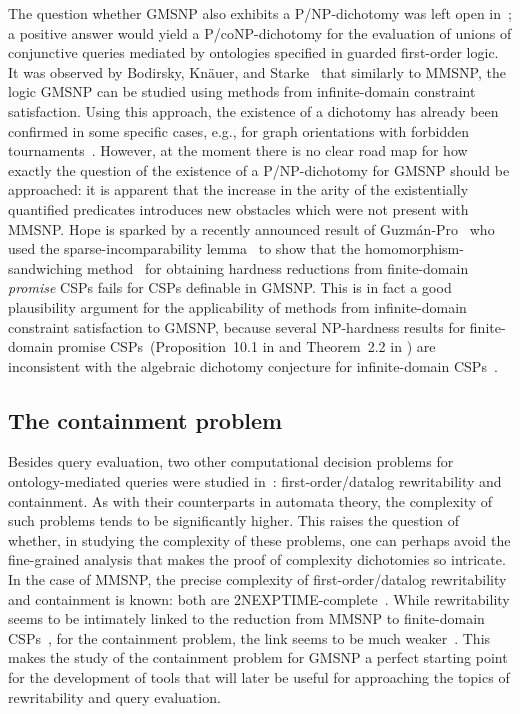 \documentclass[oneside,reqno,12pt]{amsart}
\theoremstyle{plain}
\theoremstyle{remark}
\newcommand{\TWONEXPTIME}{{\textup{\textsf{2NEXPTIME}}}\xspace}
\begin{document}
The question whether GMSNP also exhibits a \textsf{P}/\textsf{NP}-dichotomy was left open in~\cite{bienvenu2014};
a positive answer would yield a \textsf{P}/\textsf{coNP}-dichotomy for the evaluation of unions of conjunctive queries mediated by ontologies specified in guarded first-order logic. 
It was observed by Bodirsky, Kn\"{a}uer, and Starke~\cite{bodirsky_asnp} that similarly to MMSNP, the logic GMSNP can be studied using methods from infinite-domain constraint satisfaction.
Using this approach, the existence of a dichotomy has already been  confirmed in some specific cases, e.g., for graph orientations with forbidden tournaments~\cite{bodirsky2023forbidden,bitter2024completion, feller2024algebraic}. 
However, at the moment there is no clear road map for how exactly the question of the existence of a \textsf{P}/\textsf{NP}-dichotomy for GMSNP should be approached: it is apparent that the increase in the arity of the existentially quantified predicates introduces new obstacles which were not present with MMSNP. 
Hope is sparked by a recently announced result of Guzm\'{a}n-Pro~\cite{guzman2024gmsnp} who used the sparse-incomparability lemma~\cite{kun2013}  to show that the homomorphism-sandwiching method~\cite{brakensiek2019algorithmic} for obtaining hardness reductions from finite-domain \emph{promise} CSPs fails for CSPs definable in GMSNP. 
This is in fact a good plausibility argument for the applicability of  methods from infinite-domain constraint satisfaction to GMSNP, because several NP-hardness results for finite-domain promise CSPs~(Proposition~10.1 in \cite{pcsp_bible} and Theorem~2.2 in \cite{wrochna_zivny2020}) are inconsistent with the algebraic dichotomy conjecture for infinite-domain CSPs~\cite{barto_pinsker_journal}.


\subsection{The containment problem}

Besides query evaluation, two other computational decision problems for ontology-mediated queries were studied in~\cite{bienvenu2014}: first-order/datalog rewritability and containment.
As with their counterparts in automata theory, the complexity of such problems tends to be significantly higher. 
This raises the question of whether, in studying the complexity of these problems, one can perhaps avoid the fine-grained analysis that makes the proof of complexity dichotomies  so intricate.
In the case of MMSNP, the precise complexity of first-order/datalog rewritability and containment is known: both are \TWONEXPTIME-complete~\cite{Collapses, mottet2021symmetries,bouhris_lutz2016}.
While rewritability seems to be intimately linked to the reduction from MMSNP to finite-domain CSPs~\cite{Collapses, mottet2021symmetries}, for the containment problem, the link seems to be much weaker~\cite{bouhris_lutz2016,bodirsky2018_article}.
This makes the study of the containment problem for GMSNP a perfect starting point for the development of tools that will later be useful for approaching the topics of rewritability and query evaluation. 
\end{document}
